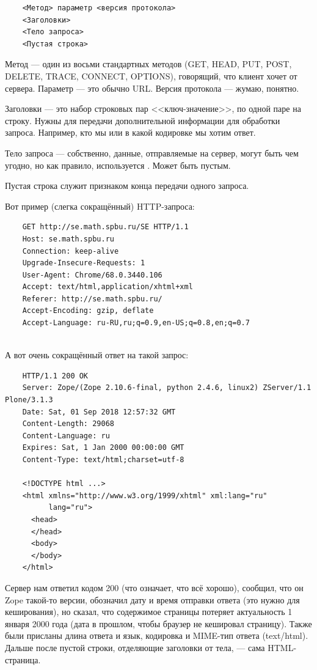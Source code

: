 \documentclass{../../text-style}
\begin{document}
\begin{verbatim}
    <Метод> параметр <версия протокола>
    <Заголовки>
    <Тело запроса>
    <Пустая строка>
\end{verbatim}

Метод --- один из восьми стандартных методов (GET, HEAD, PUT, POST, DELETE, TRACE, CONNECT, OPTIONS), говорящий, что клиент хочет от сервера. Параметр --- это обычно URL. Версия протокола --- жумаю, понятно.

Заголовки --- это набор строковых пар <<ключ-значение>>, по одной паре на строку. Нужны для передачи дополнительной информации для обработки запроса. Например, кто мы или в какой кодировке мы хотим ответ.

Тело запроса --- собственно, данные, отправляемые на сервер, могут быть чем угодно, но как правило, используется . Может быть пустым.

Пустая строка служит признаком конца передачи одного запроса.

Вот пример (слегка сокращённый) HTTP-запроса:

\begin{verbatim}
    GET http://se.math.spbu.ru/SE HTTP/1.1
    Host: se.math.spbu.ru
    Connection: keep-alive
    Upgrade-Insecure-Requests: 1
    User-Agent: Chrome/68.0.3440.106 
    Accept: text/html,application/xhtml+xml
    Referer: http://se.math.spbu.ru/
    Accept-Encoding: gzip, deflate
    Accept-Language: ru-RU,ru;q=0.9,en-US;q=0.8,en;q=0.7
    
\end{verbatim}

А вот очень сокращённый ответ на такой запрос:

\begin{verbatim}
    HTTP/1.1 200 OK
    Server: Zope/(Zope 2.10.6-final, python 2.4.6, linux2) ZServer/1.1 Plone/3.1.3
    Date: Sat, 01 Sep 2018 12:57:32 GMT
    Content-Length: 29068
    Content-Language: ru
    Expires: Sat, 1 Jan 2000 00:00:00 GMT
    Content-Type: text/html;charset=utf-8
    
    <!DOCTYPE html ...>
    <html xmlns="http://www.w3.org/1999/xhtml" xml:lang="ru"
          lang="ru">
      <head>
      </head>
      <body>
      </body>
    </html>
\end{verbatim}

Сервер нам ответил кодом 200 (что означает, что всё хорошо), сообщил, что он Zope такой-то версии, обозначил дату и время отправки ответа (это нужно для кеширования), но сказал, что содержимое страницы потеряет актуальность 1 января 2000 года (дата в прошлом, чтобы браузер не кешировал страницу). Также были присланы длина ответа и язык, кодировка и MIME-тип ответа (text/html). Дальше после пустой строки, отделяющие заголовки от тела, --- сама HTML-страница.
\end{document}
